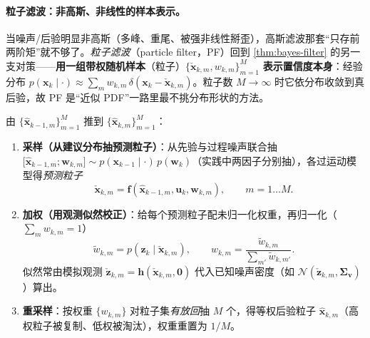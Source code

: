 \paragraph{粒子滤波：非高斯、非线性的样本表示。}
当噪声/后验明显非高斯（多峰、重尾、被强非线性掰歪），高斯滤波那套“只存前两阶矩”就不够了。\emph{粒子滤波}（particle filter，PF）回到 \cref{thm:bayes-filter} 的另一支对策——\textbf{用一组带权随机样本}（粒子）$\{\check{\mathbf{x}}_{k,m},w_{k,m}\}_{m=1}^M$ \textbf{表示置信度本身}：经验分布 $p(\mathbf{x}_k\mid\cdot)\approx\sum_m w_{k,m}\,\delta(\mathbf{x}_k-\check{\mathbf{x}}_{k,m})$。粒子数 $M\to\infty$ 时它依分布收敛到真后验，故 PF 是“近似 PDF”一路里最不挑分布形状的方法\cite{barfoot2024state,thrun2005probabilistic}。

\begin{algo}\label{algo:pf}
由 $\{\hat{\mathbf{x}}_{k-1,m}\}_{m=1}^M$ 推到 $\{\hat{\mathbf{x}}_{k,m}\}_{m=1}^M$\cite{barfoot2024state,thrun2005probabilistic}：
\begin{enumerate}
  \item \textbf{采样（从建议分布抽预测粒子）}：从先验与过程噪声联合抽 $\big[\hat{\mathbf{x}}_{k-1,m};\mathbf{w}_{k,m}\big]\sim p(\mathbf{x}_{k-1}\mid\cdot)\,p(\mathbf{w}_k)$（实践中两因子分别抽），各过运动模型得\emph{预测粒子}
  \begin{equation}
    \check{\mathbf{x}}_{k,m}=\mathbf{f}(\hat{\mathbf{x}}_{k-1,m},\mathbf{u}_k,\mathbf{w}_{k,m}),\qquad m=1\dots M.
    \label{eq:pf-predict}
  \end{equation}
  \item \textbf{加权（用观测似然校正）}：给每个预测粒子配未归一化权重，再归一化（$\sum_m w_{k,m}=1$）
  \begin{equation}
    \tilde{w}_{k,m}=p(\mathbf{z}_k\mid\check{\mathbf{x}}_{k,m}),\qquad
    w_{k,m}=\frac{\tilde{w}_{k,m}}{\sum_{m'}\tilde{w}_{k,m'}}.
    \label{eq:pf-weight}
  \end{equation}
  似然常由模拟观测 $\check{\mathbf{z}}_{k,m}=\mathbf{h}(\check{\mathbf{x}}_{k,m},\mathbf{0})$ 代入已知噪声密度（如 $\mathcal{N}(\check{\mathbf{z}}_{k,m},\boldsymbol{\Sigma}_{\mathbf{v}})$）算出。
  \item \textbf{重采样}：按权重 $\{w_{k,m}\}$ 对粒子集\emph{有放回}抽 $M$ 个，得等权后验粒子 $\hat{\mathbf{x}}_{k,m}$（高权粒子被复制、低权被淘汰），权重重置为 $1/M$。
\end{enumerate}
\end{algo}


